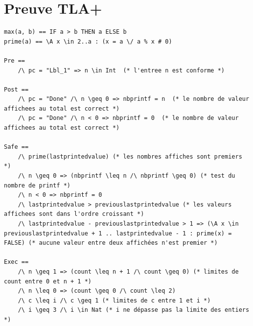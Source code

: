 \documentclass{scrreprt}
\begin{document}
\section{Preuve TLA+}
\begin{lstlisting}
max(a, b) == IF a > b THEN a ELSE b
prime(a) == \A x \in 2..a : (x = a \/ a % x # 0)

Pre ==
    /\ pc = "Lbl_1" => n \in Int  (* l'entree n est conforme *)

Post == 
    /\ pc = "Done" /\ n \geq 0 => nbprintf = n  (* le nombre de valeur affichees au total est correct *)
    /\ pc = "Done" /\ n < 0 => nbprintf = 0  (* le nombre de valeur affichees au total est correct *)

Safe ==
    /\ prime(lastprintedvalue) (* les nombres affiches sont premiers *)
    /\ n \geq 0 => (nbprintf \leq n /\ nbprintf \geq 0) (* test du nombre de printf *)
    /\ n < 0 => nbprintf = 0
    /\ lastprintedvalue > previouslastprintedvalue (* les valeurs affichees sont dans l'ordre croissant *)
    /\ lastprintedvalue - previouslastprintedvalue > 1 => (\A x \in previouslastprintedvalue + 1 .. lastprintedvalue - 1 : prime(x) = FALSE) (* aucune valeur entre deux affichées n'est premier *) 
   
Exec == 
    /\ n \geq 1 => (count \leq n + 1 /\ count \geq 0) (* limites de count entre 0 et n + 1 *)
    /\ n \leq 0 => (count \geq 0 /\ count \leq 2)
    /\ c \leq i /\ c \geq 1 (* limites de c entre 1 et i *)
    /\ i \geq 3 /\ i \in Nat (* i ne dépasse pas la limite des entiers *)
\end{lstlisting}
\end{document}
